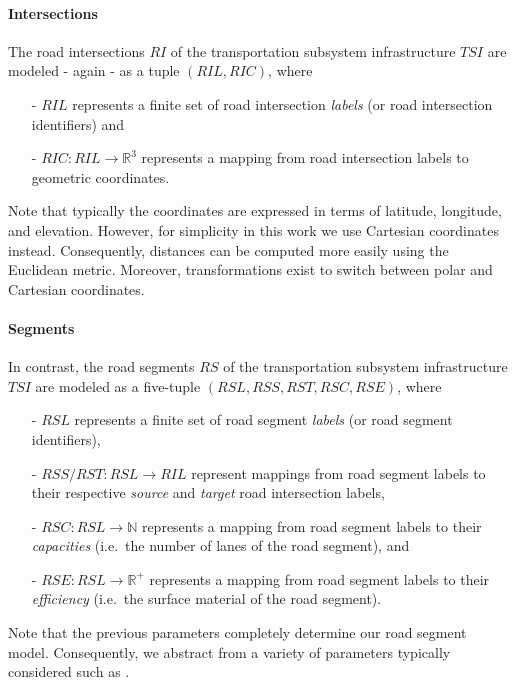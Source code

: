 \paragraph{Intersections}
\label{intersections}

The road intersections $RI$ of the transportation subsystem infrastructure $TSI$ are modeled - again - as a tuple $(RIL, RIC)$, where
\begin{itemize}
	\item[-] $RIL$ represents a finite set of road intersection \textit{labels} (or road intersection identifiers) and
	\item[-] $RIC: RIL \rightarrow \mathbb{R}^3$ represents a mapping from road intersection labels to geometric coordinates.
\end{itemize}
Note that typically the coordinates are expressed in terms of latitude, longitude, and elevation. However, for simplicity in this work we use Cartesian coordinates instead. Consequently, distances can be computed more easily using the Euclidean metric. Moreover, transformations exist to switch between polar and Cartesian coordinates.

\paragraph{Segments}
\label{segments}

In contrast, the road segments $RS$ of the transportation subsystem infrastructure $TSI$ are modeled as a five-tuple $(RSL, RSS, RST, RSC, RSE)$, where
\begin{itemize}
	\item[-] $RSL$ represents a finite set of road segment \textit{labels} (or road segment identifiers),
	\item[-] $RSS/RST: RSL \rightarrow RIL$ represent mappings from road segment labels to their respective \textit{source} and \textit{target} road intersection labels,
	\item[-] $RSC: RSL \rightarrow \mathbb{N}$ represents a mapping from road segment labels to their \textit{capacities} (i.e.\ the number of lanes of the road segment), and
	\item[-] $RSE: RSL \rightarrow \mathbb{R}^+$ represents a mapping from road segment labels to their \textit{efficiency} (i.e.\ the surface material of the road segment).
\end{itemize}
Note that the previous parameters completely determine our road segment model. Consequently, we abstract from a variety of parameters typically considered such as .

